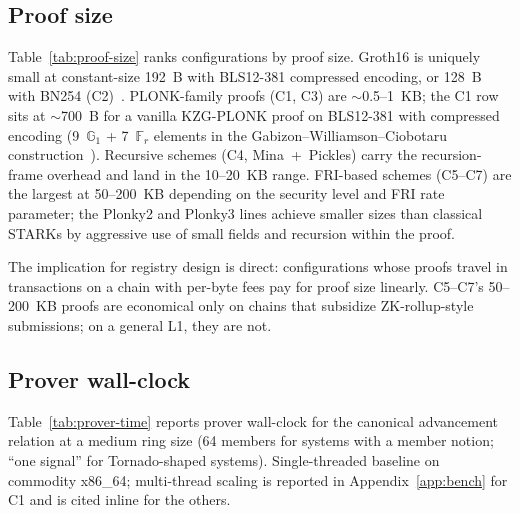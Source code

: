 

\subsection{Proof size}
\label{sec:analysis-size}

Table~\ref{tab:proof-size} ranks configurations by proof size.
Groth16 is uniquely small at constant-size 192~B with BLS12-381
compressed encoding, or 128~B with BN254 (C2)~\cite{groth-2016-onpairing}.
PLONK-family proofs (C1, C3) are $\sim$0.5--1~KB; the C1 row sits
at $\sim$700~B for a vanilla KZG-PLONK proof on BLS12-381 with
compressed encoding (9~$\mathbb{G}_1$ + 7~$\mathbb{F}_r$ elements
in the Gabizon--Williamson--Ciobotaru
construction~\cite{gabizon-2019-plonk}). Recursive schemes (C4,
Mina~+~Pickles) carry the recursion-frame overhead and land in the
10--20~KB range. FRI-based schemes (C5--C7) are the largest at
50--200~KB depending on the security level and FRI rate parameter;
the Plonky2 and Plonky3 lines achieve smaller sizes than classical
STARKs by aggressive use of small fields and recursion within the
proof.



The implication for registry design is direct: configurations whose
proofs travel in transactions on a chain with per-byte fees pay for
proof size linearly. C5--C7's 50--200~KB proofs are economical only
on chains that subsidize ZK-rollup-style submissions; on a general
L1, they are not.

\subsection{Prover wall-clock}
\label{sec:analysis-prover}

Table~\ref{tab:prover-time} reports prover wall-clock for the
canonical advancement relation at a medium ring size (64 members for
systems with a member notion; ``one signal'' for Tornado-shaped
systems). Single-threaded baseline on commodity x86\_64; multi-thread
scaling is reported in Appendix~\ref{app:bench} for C1 and is cited
inline for the others.

